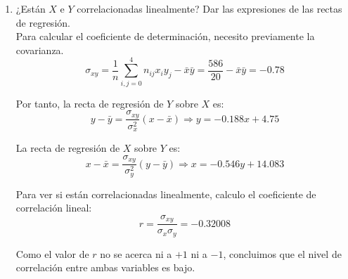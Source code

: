 \begin{ejercicio}
\begin{enumerate}
        \item ¿Están $X$ e $Y$ correlacionadas linealmente? Dar las expresiones de las rectas de regresión.\\

        Para calcular el coeficiente de determinación, necesito previamente la covarianza.
        \begin{equation*}
            \sigma_{xy} = \frac{1}{n}\sum_{i,j=0}^4 n_{ij}x_iy_j - \bar{x}\bar{y} = \frac{586}{20}- \bar{x}\bar{y} = -0.78
        \end{equation*}

        Por tanto, la recta de regresión de $Y$ sobre $X$ es:
        \begin{equation*}
            y-\bar{y} = \frac{\sigma_{xy}}{\sigma_x^2}(x-\bar{x}) \Longrightarrow y=-0.188x+4.75
        \end{equation*}

        La recta de regresión de $X$ sobre $Y$ es:
        \begin{equation*}
            x-\bar{x} = \frac{\sigma_{xy}}{\sigma_y^2}(y-\bar{y}) \Longrightarrow x=-0.546y+14.083
        \end{equation*}

        Para ver si están correlacionadas linealmente, calculo el coeficiente de correlación lineal:
        \begin{equation*}
            r = \frac{\sigma_{xy}}{\sigma_x \sigma_y} = -0.32008
        \end{equation*}

        Como el valor de $r$ no se acerca ni a $+1$ ni a $-1$, concluimos que el nivel de correlación entre ambas variables es bajo.
    \end{enumerate}
\end{ejercicio}

